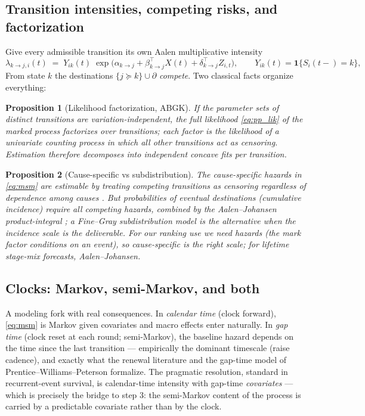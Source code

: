 \documentclass[11pt]{article}
\newcommand{\one}{\mathbf{1}}
\newtheorem{proposition}{Proposition}
\numberwithin{assumption}{section}
\numberwithin{proposition}{section}
\numberwithin{remark}{section}
\begin{document}
\subsection{Transition intensities, competing risks, and factorization}
Give every admissible transition its own Aalen multiplicative intensity
\begin{equation}
\lambda_{k\to j,i}(t)\;=\;Y_{ik}(t)\;
\exp\!\big(\alpha_{k\to j}+\beta_{k\to j}^\top X(t)
+\delta_{k\to j}^\top Z_{i,t}\big),
\qquad Y_{ik}(t)=\one\{S_i(t-)=k\},
\label{eq:msm}
\end{equation}
From state $k$ the destinations $\{j\succeq k\}\cup\partial$ \emph{compete}.
Two classical facts organize everything:

\begin{proposition}[Likelihood factorization, ABGK]
If the parameter sets of distinct transitions are variation-independent,
the full likelihood \eqref{eq:pp_lik} of the marked process factorizes over
transitions; each factor is the likelihood of a univariate counting process
in which all other transitions act as censoring. Estimation therefore
decomposes into independent concave fits per transition.
\end{proposition}

\begin{proposition}[Cause-specific vs subdistribution]
The cause-specific hazards in \eqref{eq:msm} are estimable by treating
competing transitions as censoring \emph{regardless of dependence} among
causes \citep{prentice1978}. But probabilities of eventual destinations
(cumulative incidence) require \emph{all} competing hazards, combined by
the Aalen--Johansen product-integral \citep{aalenjohansen1978}; a
Fine--Gray subdistribution model \citep{finegray1999} is the alternative
when the incidence scale is the deliverable. For our ranking use we need
hazards (the mark factor conditions on an event), so cause-specific is the
right scale; for lifetime stage-mix forecasts, Aalen--Johansen.
\end{proposition}

\subsection{Clocks: Markov, semi-Markov, and both}
A modeling fork with real consequences. In \emph{calendar time} (clock
forward), \eqref{eq:msm} is Markov given covariates and macro effects enter
naturally. In \emph{gap time} (clock reset at each round; semi-Markov), the
baseline hazard depends on the time since the last transition ---
empirically the dominant timescale (raise cadence), and exactly what the
renewal literature and the gap-time model of
Prentice--Williams--Peterson \citep{pwp1981} formalize. The pragmatic
resolution, standard in recurrent-event survival, is calendar-time
intensity with gap-time \emph{covariates} --- which is precisely the bridge
to step 3: the semi-Markov content of the process is carried by a
predictable covariate rather than by the clock.
\end{document}
